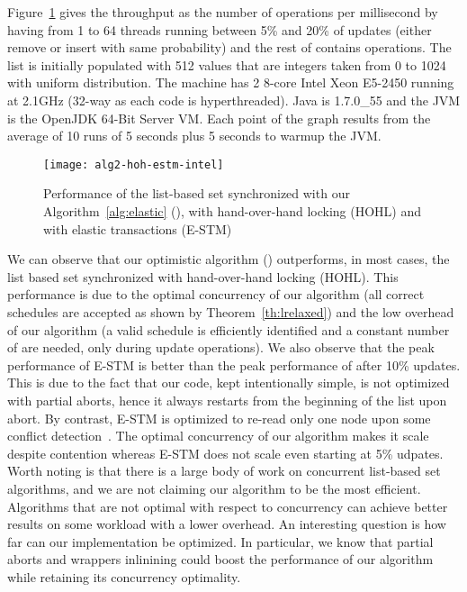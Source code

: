 \documentclass[11pt,pdftex,letterpaper]{article}
\begin{document}
Figure~\ref{fig:alg2-vs-hoh} gives the throughput as the number of operations per millisecond by having from 1 to 64 threads running between 5\% and 
20\% of updates (either remove or insert with same probability) and the rest of contains operations. The list is initially populated with 512 values that are integers taken from 0 to 1024 with uniform distribution. The machine has 
2 8-core Intel Xeon E5-2450 running at 2.1GHz (32-way as each code is hyperthreaded).
Java is 1.7.0\_55 and the JVM is the OpenJDK 64-Bit Server VM. Each point of the graph results from the average of 10 runs of 5 seconds plus 5 seconds to warmup the JVM.
\begin{figure}
  \begin{center}
    \texttt{[image: alg2-hoh-estm-intel]}
    \caption{Performance of the list-based set synchronized with our Algorithm~\ref{alg:elastic} (), with hand-over-hand locking (HOHL) and with elastic transactions (E-STM)\label{fig:alg2-vs-hoh}}
  \end{center}
\end{figure}

We can observe that our optimistic algorithm () outperforms, in most cases, the list based set synchronized with hand-over-hand locking (HOHL). 
This performance is due to the optimal concurrency of our algorithm (all correct schedules are accepted as shown by Theorem~\ref{th:lrelaxed}) and the low overhead of our algorithm (a valid schedule is efficiently identified and a constant number of  are needed, only during update operations).
We also observe that the peak performance of E-STM is better than the peak performance of  after 10\% updates.
This is due to the fact that our code, kept intentionally simple, 
is not optimized with partial aborts, hence it always restarts from the beginning of the list upon abort. By contrast, E-STM is optimized to re-read 
only one node upon some conflict detection~\cite{FGG09}.   The optimal concurrency of our algorithm makes it scale despite contention whereas E-STM does not scale even starting at 5\% udpates.
Worth noting is that there is a large body of work on concurrent list-based set algorithms, and we are not claiming our algorithm to be the most efficient. 
Algorithms that are not optimal with respect to concurrency can achieve better results on some workload with a lower overhead. 
An interesting question is how far can our implementation be optimized. In particular, we know that partial aborts and wrappers inlinining could 
boost the performance of our algorithm while retaining its concurrency optimality.



 
\end{document}
